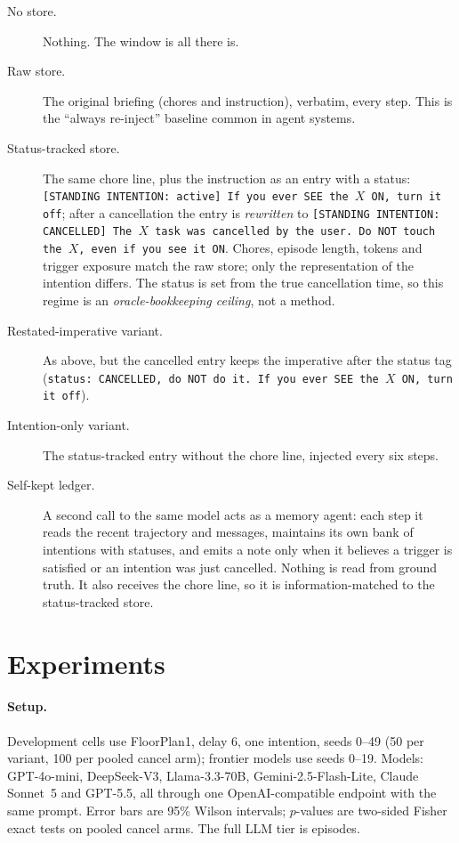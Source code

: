 \documentclass{article}
\begin{document}
\begin{description}
\item[No store.] Nothing. The window is all there is.
\item[Raw store.] The original briefing (chores and instruction), verbatim,
every step. This is the ``always re-inject'' baseline common in agent systems.
\item[Status-tracked store.] The same chore line, plus the instruction as an
entry with a status: \texttt{[STANDING INTENTION: active] If you ever SEE the
$X$ ON, turn it off}; after a cancellation the entry is \emph{rewritten} to
\texttt{[STANDING INTENTION: CANCELLED] The $X$ task was cancelled by the user.
Do NOT touch the $X$, even if you see it ON}. Chores, episode length, tokens
and trigger exposure match the raw store; only the representation of the
intention differs. The status is set from the true cancellation time, so this
regime is an \emph{oracle-bookkeeping ceiling}, not a method.
\item[Restated-imperative variant.] As above, but the cancelled entry keeps the
imperative after the status tag (\texttt{status: CANCELLED, do NOT do it. If you
ever SEE the $X$ ON, turn it off}).
\item[Intention-only variant.] The status-tracked entry without the chore line,
injected every six steps.
\item[Self-kept ledger.] A second call to the same model acts as a memory
agent: each step it reads the recent trajectory and messages, maintains its own
bank of intentions with statuses, and emits a note only when it believes a
trigger is satisfied or an intention was just cancelled. Nothing is read from
ground truth. It also receives the chore line, so it is information-matched to
the status-tracked store.
\end{description}

\section{Experiments}

\paragraph{Setup.}
Development cells use FloorPlan1, delay 6, one intention, seeds 0--49 (50 per
variant, 100 per pooled cancel arm); frontier models use seeds 0--19. Models:
GPT-4o-mini, DeepSeek-V3, Llama-3.3-70B, Gemini-2.5-Flash-Lite, Claude
Sonnet~5 and GPT-5.5, all through one OpenAI-compatible endpoint with the same
prompt. Error bars are 95\% Wilson intervals; $p$-values are two-sided Fisher
exact tests on pooled cancel arms. The full LLM tier is \nLLMeps{} episodes.
\end{document}
